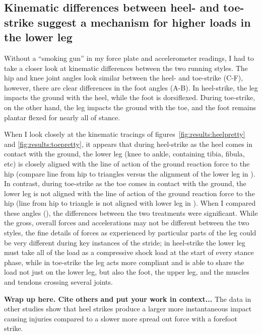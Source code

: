 \subsection{Kinematic differences between heel- and toe-strike suggest a mechanism for higher loads in the lower leg}

Without a ``smoking gun'' in my force plate and accelerometer readings, I had to take a closer look at kinematic differences between the two running styles. The hip and knee joint angles look similar between the heel- and toe-strike (C-F), however, there are clear differences in the foot angles (A-B). In heel-strike, the leg impacts the ground with the heel, while the foot is dorsiflexed. During toe-strike, on the other hand, the leg impacts the ground with the toe, and the foot remains plantar flexed for nearly all of stance.

When I look closely at the kinematic tracings of figures~\ref{fig:results:heelpretty} and \ref{fig:results:toepretty}, it appears that during heel-strike as the heel comes in contact with the ground, the lower leg (knee to ankle, containing tibia, fibula, etc) is closely aligned with the line of action of the ground reaction force to the hip (compare line from hip to triangles versus the alignment of the lower leg in ). In contrast, during toe-strike as the toe comes in contact with the ground, the lower leg is not aligned with the line of action of the ground reaction force to the hip (line from hip to triangle is not aligned with lower leg in ). When I compared these angles (), the differences between the two treatments were significant. While the gross, overall forces and accelerations may not be different between the two styles, the fine details of forces as experienced by particular parts of the leg could be very different during key instances of the stride; in heel-strike the lower leg must take all of the load as a compressive shock load at the start of every stance phase, while in toe-strike the leg acts more compliant and is able to share the load not just on the lower leg, but also the foot, the upper leg, and the muscles and tendons crossing several joints. 

\textbf{Wrap up here. Cite others and put your work in context...} The data in other studies show that heel strikes produce a larger more instantaneous impact causing injuries compared to a slower more spread out force with a forefoot strike. 
